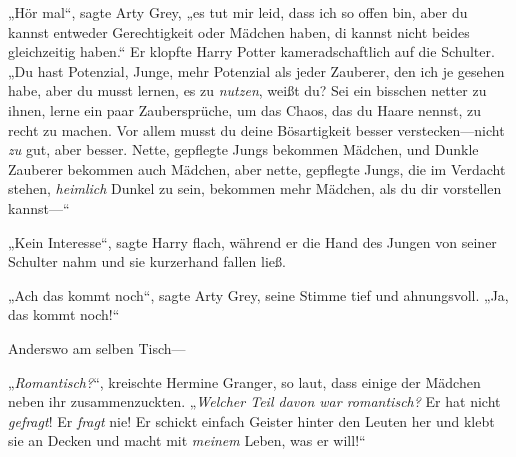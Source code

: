 „Hör mal“, sagte Arty Grey, „es tut mir leid, dass ich so offen bin, aber du kannst entweder Gerechtigkeit oder Mädchen haben, di kannst nicht beides gleichzeitig haben.“ Er klopfte Harry Potter kameradschaftlich auf die Schulter. „Du hast Potenzial, Junge, mehr Potenzial als jeder Zauberer, den ich je gesehen habe, aber du musst lernen, es zu \emph{nutzen}, weißt du? Sei ein bisschen netter zu ihnen, lerne ein paar Zaubersprüche, um das Chaos, das du Haare nennst, zu recht zu machen. Vor allem musst du deine Bösartigkeit besser verstecken—nicht \emph{zu} gut, aber besser. Nette, gepflegte Jungs bekommen Mädchen, und Dunkle Zauberer bekommen auch Mädchen, aber nette, gepflegte Jungs, die im Verdacht stehen, \emph{heimlich} Dunkel zu sein, bekommen mehr Mädchen, als du dir vorstellen kannst—“

„Kein Interesse“, sagte Harry flach, während er die Hand des Jungen von seiner Schulter nahm und sie kurzerhand fallen ließ.

„Ach das kommt noch“, sagte Arty Grey, seine Stimme tief und ahnungsvoll. „Ja, das kommt noch!“

Anderswo am selben Tisch—

„\emph{Romantisch?}“, kreischte Hermine Granger, so laut, dass einige der Mädchen neben ihr zusammenzuckten. „\emph{Welcher Teil davon war romantisch?} Er hat nicht \emph{gefragt}! Er \emph{fragt} nie! Er schickt einfach Geister hinter den Leuten her und klebt sie an Decken und macht mit \emph{meinem} Leben, was er will!“

